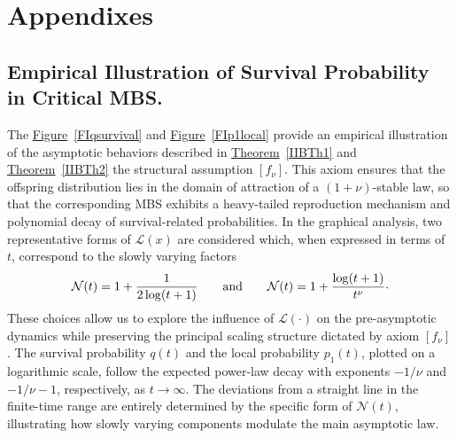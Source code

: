 \documentclass[10pt,reqno]{amsart}
\theoremstyle{definition}
\numberwithin{equation}{section}
\begin{document}
\section{Appendixes}             \label{IIBSec6}

\subsection{Empirical Illustration of Survival Probability in Critical MBS.}


    The {\hyperref[FIqsurvival]{Figure}~\ref{FIqsurvival}} and {\hyperref[FIp1local]{Figure}~\ref{FIp1local}} provide
    an empirical illustration of the asymptotic behaviors described in {\hyperref[IIBTh1]{Theorem}~\ref{IIBTh1}} and
    {\hyperref[IIBTh2]{Theorem}~\ref{IIBTh2}} the structural assumption $[f_{\nu}]$. This axiom ensures that the
    offspring distribution lies in the domain of attraction of a $(1+\nu)$-stable law, so that the corresponding
    MBS exhibits a heavy-tailed reproduction mechanism and polynomial decay of survival-related probabilities.
    In the graphical analysis, two representative forms of $\mathcal{L}(x)$ are considered which, when expressed
    in terms of $t$, correspond to the slowly varying factors
\[
    \mathcal{N}(t)=1+\frac{1}{2\log(t+1)} \qquad {\text{and}} \qquad  \mathcal{N}(t)=1+\frac{\log(t+1)}{t^{\nu}}{\raise1.5pt\hbox{.}}
\]
    These choices allow us to explore the influence of $\mathcal{L}(\cdot)$ on the pre-asymptotic dynamics
    while preserving the principal scaling structure dictated by axiom $[f_{\nu}]$. The survival probability $q(t)$ and
    the local probability $p_1(t)$, plotted on a logarithmic scale, follow the expected power-law decay with
    exponents $-1/\nu$ and $-1/\nu - 1$, respectively, as $t \to \infty$. The deviations from a straight line
    in the finite-time range are entirely determined by the specific form of $\mathcal{N}(t)$,
    illustrating how slowly varying components modulate the main asymptotic law.
\end{document}
